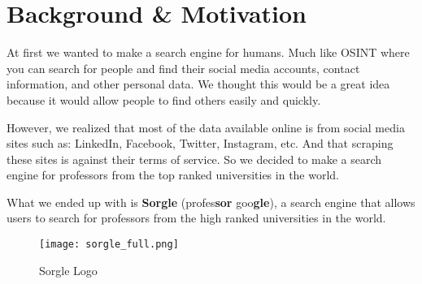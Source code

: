 \section{Background \& Motivation}

At first we wanted to make a search engine for humans. Much like OSINT where you can search for people and find their social media accounts, contact information, and other personal data. We thought this would be a great idea because it would allow people to find others easily and quickly.

However, we realized that most of the data available online is from social media sites such as: LinkedIn, Facebook, Twitter, Instagram, etc. And that scraping these sites is against their terms of service. So we decided to make a search engine for professors from the top ranked universities in the world. 

What we ended up with is \textbf{Sorgle} (profes\textbf{sor} goo\textbf{gle}), a search engine that allows users to search for professors from the high ranked universities in the world.

\begin{figure}[h]
    \centering
    \texttt{[image: sorgle\_full.png]}
    \caption{Sorgle Logo}
    \label{fig:sorgle-logo}
\end{figure}